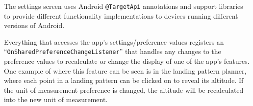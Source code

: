 The settings screen uses Android \texttt{@TargetApi} annotations and support libraries to provide different functionality implementations to devices running different versions of Android.

Everything that accesses the app's settings/preference values registers an ``\texttt{OnSharedPreference\-ChangeListener}'' that handles any changes to the preference values to recalculate or change the display of one of the app's features. One example of where this feature can be seen is in the landing pattern planner, where each point in a landing pattern can be clicked on to reveal its altitude. If the unit of measurement preference is changed, the altitude will be recalculated into the new unit of measurement.


